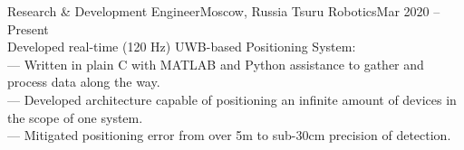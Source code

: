 \resumeSubheading
  {Research \& Development Engineer}{Moscow, Russia}
  {Tsuru Robotics}{Mar 2020 -- Present}
      {\ \ \ \\}
      {Developed real-time (120 Hz) UWB-based Positioning System:}\\
      {— Written in plain C with MATLAB and Python assistance to gather and process data along the way.}\\
      {— Developed architecture capable of positioning an infinite amount of devices in the scope of one system.}\\
      {— Mitigated positioning error from over 5m to sub-30cm precision of detection.}
